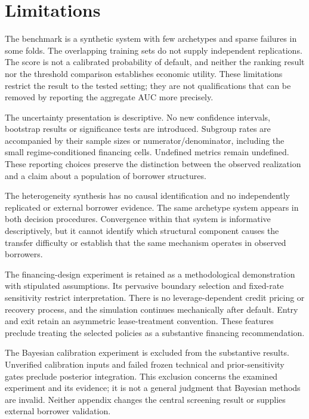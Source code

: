 \documentclass[11pt,a4paper]{article}
\begin{document}
\section{Limitations}
The benchmark is a synthetic system with few archetypes and sparse failures in some folds. The overlapping training sets do not supply independent replications. The score is not a calibrated probability of default, and neither the ranking result nor the threshold comparison establishes economic utility. These limitations restrict the result to the tested setting; they are not qualifications that can be removed by reporting the aggregate AUC more precisely.

The uncertainty presentation is descriptive. No new confidence intervals, bootstrap results or significance tests are introduced. Subgroup rates are accompanied by their sample sizes or numerator/denominator, including the small regime-conditioned financing cells. Undefined metrics remain undefined. These reporting choices preserve the distinction between the observed realization and a claim about a population of borrower structures.

The heterogeneity synthesis has no causal identification and no independently replicated or external borrower evidence. The same archetype system appears in both decision procedures. Convergence within that system is informative descriptively, but it cannot identify which structural component causes the transfer difficulty or establish that the same mechanism operates in observed borrowers.

The financing-design experiment is retained as a methodological demonstration with stipulated assumptions. Its pervasive boundary selection and fixed-rate sensitivity restrict interpretation. There is no leverage-dependent credit pricing or recovery process, and the simulation continues mechanically after default. Entry and exit retain an asymmetric lease-treatment convention. These features preclude treating the selected policies as a substantive financing recommendation.

The Bayesian calibration experiment is excluded from the substantive results. Unverified calibration inputs and failed frozen technical and prior-sensitivity gates preclude posterior integration. This exclusion concerns the examined experiment and its evidence; it is not a general judgment that Bayesian methods are invalid. Neither appendix changes the central screening result or supplies external borrower validation.
\end{document}
